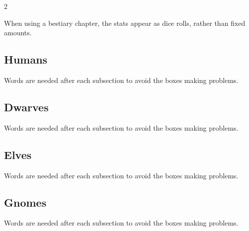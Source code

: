 \documentclass[a4paper,openany]{book}
\begin{document}
\begin{multicols}{2}


When using a bestiary chapter, the stats appear as dice rolls, rather than fixed amounts.

\subsection{Humans}
Words are needed after each subsection to avoid the boxes making problems.



\humanfarmer

\humansoldier

\sunguard

\humandiplomat

\humandiplomat

\doula

\humanbard

\humanthief

\humanalchemist

\humanalchemist

\necromancer

\subsection{Dwarves}
Words are needed after each subsection to avoid the boxes making problems.

\dwarvensoldier

\dwarventrader

\dwarvenrunemaster

\subsection{Elves}
Words are needed after each subsection to avoid the boxes making problems.



\elf

\elf

\elvenenchanter

\showStdSpells

\hag

\showStdSpells

\subsection{Gnomes}
Words are needed after each subsection to avoid the boxes making problems.


\end{multicols}
\end{document}
